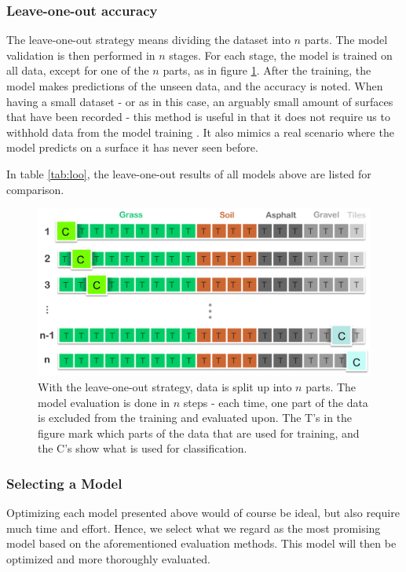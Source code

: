 \subsubsection{Leave-one-out accuracy}
The leave-one-out strategy means dividing the dataset into $n$ parts. The model validation is then performed in $n$ stages. For each stage, the model is trained on all data, except for one of the $n$ parts, as in figure \ref{fig:loo}. After the training, the model makes predictions of the unseen data, and the accuracy is noted. When having a small dataset - or as in this case, an arguably small amount of surfaces that have been recorded - this method is useful in that it does not require us to withhold data from the model training \citep{raschka}. It also mimics a real scenario where the model predicts on a surface it has never seen before.

In table \ref{tab:loo}, the leave-one-out results of all models above are listed for comparison.

\begin{figure}[h]
	\centering
	\includegraphics[scale=0.3]{figs_temp/loo.jpg}
	\caption{With the leave-one-out strategy, data is split up into $n$ parts. The model evaluation is done in $n$ steps - each time, one part of the data is excluded from the training and evaluated upon. The T's in the figure mark which parts of the data that are used for training, and the C's show what is used for classification.}
	\label{fig:loo}
\end{figure}

\subsubsection{Selecting a Model}
Optimizing each model presented above would of course be ideal, but also require much time and effort. Hence, we select what we regard as the most promising model based on the aforementioned evaluation methods. This model will then be optimized and more thoroughly evaluated.

